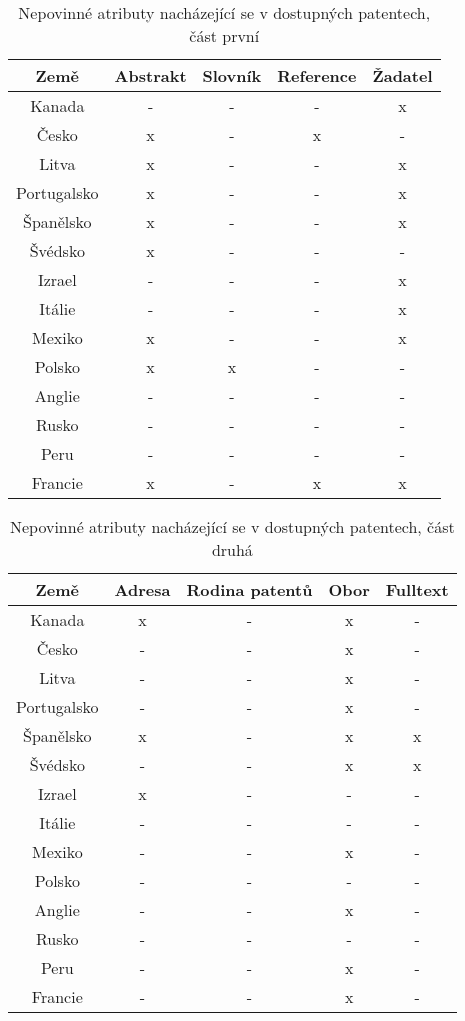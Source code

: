 	\begin{table}[H]
	\centering
	\begin{tabular}{|c|c|c|c|c|} 
	\hline
	\textbf{Země}    & \textbf{Abstrakt} & \textbf{Slovník} & \textbf{Reference} & \textbf{Žadatel} \\
	\hline
	Kanada & - & - & - & x \\
	\hline
	Česko & x & - & x & - \\
	\hline
	Litva & x & - & - & x \\
	\hline
	Portugalsko & x & - & - & x \\
	\hline
	Španělsko & x & - & - & x \\
	\hline
	Švédsko & x & - & - & - \\
	\hline
	Izrael & - & - & - & x \\
	\hline
	Itálie & - & - & - & x \\
	\hline
	Mexiko & x & - & - & x \\
	\hline
	Polsko & x & x & - & - \\
	\hline
	Anglie & - & - & - & - \\
	\hline
	Rusko & - & - & - & - \\
	\hline
	Peru & - & - & - & - \\
	\hline
	Francie & x & - & x & x \\
	\hline
	\end{tabular}
	\caption{Nepovinné atributy nacházející se v dostupných patentech, část první}
	\label{tab:table_attributes_notcrit1}
	\end{table}

	\begin{table}[H]
	\centering
	\begin{tabular}{|c|c|c|c|c|} 
	\hline
	\textbf{Země}    &  \textbf{Adresa} & \textbf{Rodina patentů} & \textbf{Obor} & \textbf{Fulltext} \\
	\hline
	Kanada & x & - & x & - \\
	\hline
	Česko & - & - & x & - \\
	\hline
	Litva & - & - & x & - \\
	\hline
	Portugalsko & - & - & x & - \\
	\hline
	Španělsko & x & - & x & x \\
	\hline
	Švédsko & - & - & x & x \\
	\hline
	Izrael & x & - & - & - \\
	\hline
	Itálie & - & - & - & - \\
	\hline
	Mexiko & - & - & x & - \\
	\hline
	Polsko & - & - & - & - \\
	\hline
	Anglie & - & - & x & - \\
	\hline
	Rusko & - & - & - & - \\
	\hline
	Peru & - & - & x & - \\
	\hline
	Francie & - & - & x & - \\
	\hline
	\end{tabular}
	\caption{Nepovinné atributy nacházející se v dostupných patentech, část druhá}
	\label{tab:table_attributes_notcrit2}
	\end{table}



